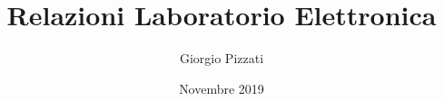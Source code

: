 \documentclass{report}
\title{Relazioni Laboratorio Elettronica}
\author{Giorgio Pizzati}
\date{Novembre 2019}
\begin{document}
\maketitle

\tableofcontents{}




\end{document}
